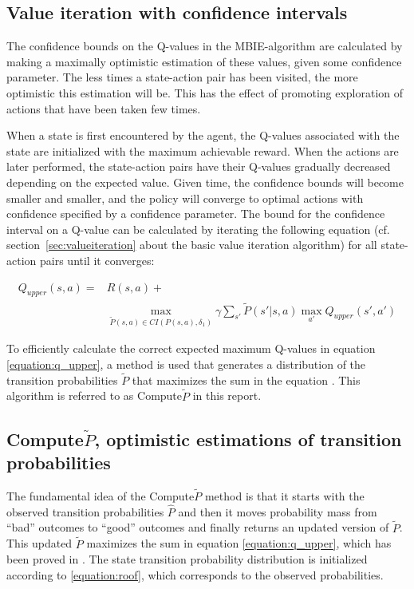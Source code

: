 \subsection{Value iteration with confidence intervals}
\label{sec:modification_conf_interval}

The confidence  bounds on the Q-values in the MBIE-algorithm are calculated by
making a maximally optimistic estimation of these values, given some confidence
parameter. The less times a state-action pair has been visited, the more
optimistic this estimation will be. This has the effect of promoting
exploration of actions that have been taken few times. 

When a state is first encountered by the agent, the Q-values associated with
the state are initialized with the maximum achievable reward. When the actions
are later performed, the state-action pairs have their Q-values gradually
decreased depending on the expected value. Given time, the confidence bounds will
become smaller and smaller, and the policy will converge to optimal actions
with confidence specified by a confidence parameter. The bound for the
confidence interval on a Q-value can be calculated by iterating the following
equation (cf. section~\ref{sec:valueiteration} about the basic value iteration
algorithm) for all state-action pairs until it converges:

\begin{align}
\label{equation:q_upper}
Q_{upper} (s, a) = & R(s, a) + \nonumber \\
& \operatorname*{max}_{\tilde{P}(s, a)\in CI(P(s, a), \delta_1)} \gamma \sum_{s'} \tilde{P}(s'|s, a)\operatorname*{max}_{a'} Q_{upper}(s', a')
\end{align}


To efficiently calculate the correct expected maximum Q-values in equation
\eqref{equation:q_upper}, a method is used that generates a distribution of the
transition probabilities $\tilde{P}$ that maximizes the sum in the equation
\parencite{Strehl20081309}. This algorithm is referred to as Compute$\tilde{P}$
in this report.

\subsection{Compute$\tilde{P}$, optimistic estimations of transition probabilities}

The fundamental idea of the Compute$\tilde{P}$ method is that it starts with
the observed transition probabilities $\hat{P}$ and then it moves probability
mass from ``bad'' outcomes to ``good'' outcomes and finally returns an updated
version of $\tilde{P}$. This updated $\tilde{P}$ maximizes the sum in equation
\eqref{equation:q_upper}, which has been proved in \textcite{Strehl20081309}.
The state transition probability distribution is initialized according to
\eqref{equation:roof}, which corresponds to the observed probabilities.

